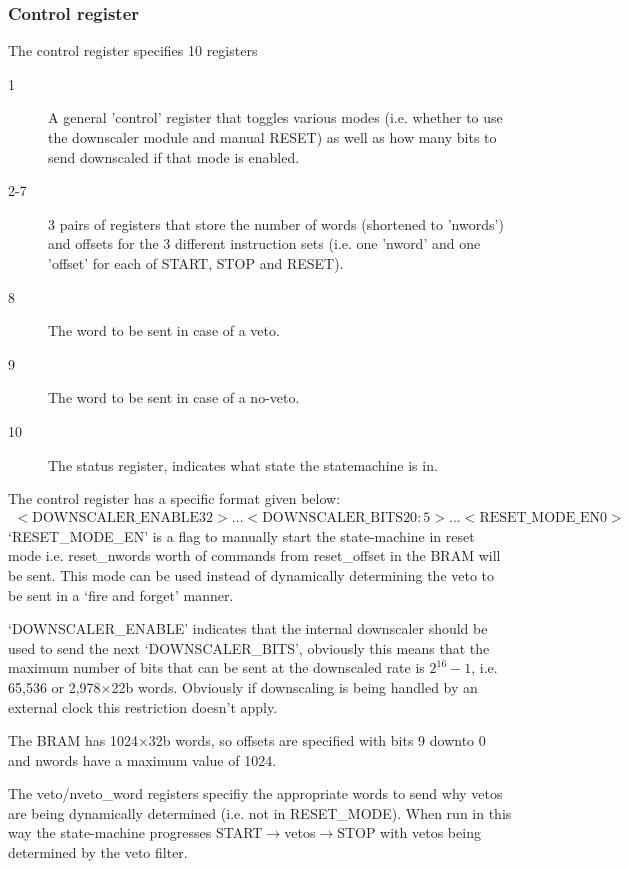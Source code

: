 \documentclass[]{article}
\begin{document}
    \subsubsection{Control register} %
    \label{sub:ctrl_reg}
      The control register specifies 10 registers
      \begin{description}
        \item[1] A general 'control' register that toggles various modes (i.e. whether to use the downscaler module and manual RESET) as well as how many bits to send downscaled if that mode is enabled.
        \item[2-7] 3 pairs of registers that store the number of words (shortened to 'nwords') and offsets for the 3 different instruction sets (i.e. one 'nword' and one 'offset' for each of START, STOP and RESET).
        \item[8] The word to be sent in case of a veto.
        \item[9] The word to be sent in case of a no-veto.
        \item[10] The status register, indicates what state the statemachine is in.
      \end{description}
      The control register has a specific format given below:
      \begin{align} \label{fmt:control_reg}
        <\text{DOWNSCALER\_ENABLE} 32>\ldots<\text{DOWNSCALER\_BITS} 20:5>\ldots<\text{RESET\_MODE\_EN} 0>
      \end{align}
      `RESET\_MODE\_EN' is a flag to manually start the state-machine in reset mode i.e. reset\_nwords worth of commands from reset\_offset in the BRAM will be sent. This mode can be used instead of dynamically determining the veto to be sent in a `fire and forget' manner.

      `DOWNSCALER\_ENABLE' indicates that the internal downscaler should be used to send the next `DOWNSCALER\_BITS', obviously this means that the maximum number of bits that can be sent at the downscaled rate is \(2^16 - 1\), i.e. 65,536 or 2,978\(\times\)22b words. Obviously if downscaling is being handled by an external clock this restriction doesn't apply.

      The BRAM has 1024\( \times \)32b words, so offsets are specified with bits 9 downto 0 and nwords have a maximum value of 1024. 

      The veto/nveto\_word registers specifiy the appropriate words to send why vetos are being dynamically determined (i.e. not in RESET\_MODE). When run in this way the state-machine progresses START\(\rightarrow\)vetos\(\rightarrow\)STOP with vetos being determined by the veto filter.
      
\end{document}
